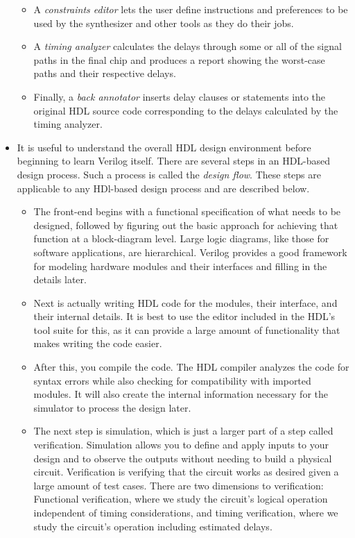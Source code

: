 \documentclass[10pt,a4paper]{article}
\begin{document}
\begin{itemize}
\begin{itemize}
\item A \textit{constraints editor} lets the user define instructions and preferences to be used by the synthesizer and other tools as they do their jobs. 
\item A \textit{timing analyzer} calculates the delays through some or all of the signal paths in the final chip and produces a report showing the worst-case paths and their respective delays.
\item Finally, a \textit{back annotator} inserts delay clauses or statements into the original HDL source code corresponding to the delays calculated by the timing analyzer. 
\end{itemize}
\item It is useful to understand the overall HDL design environment before beginning to learn Verilog itself. There are several steps in an HDL-based design process. Such a process is called the \textit{design flow}. These steps are applicable to any HDl-based design process and are described below.
\begin{itemize}
\item The front-end begins with a functional specification of what needs to be designed, followed by figuring out the basic approach for achieving that function at a block-diagram level. Large logic diagrams, like those for software applications, are hierarchical. Verilog provides a good framework for modeling hardware modules and their interfaces and filling in the details later.
\item Next is actually writing HDL code for the modules, their interface, and their internal details. It is best to use the editor included in the HDL's tool suite for this, as it can provide a large amount of functionality that makes writing the code easier.
\item After this, you compile the code. The HDL compiler analyzes the code for syntax errors while also checking for compatibility with imported modules. It will also create the internal information necessary for the simulator to process the design later.
\item The next step is simulation, which is just a larger part of a step called verification. Simulation allows you to define and apply inputs to your design and to observe the outputs without needing to build a physical circuit. Verification is verifying that the circuit works as desired given a large amount of test cases. There are two dimensions to verification: Functional verification, where we study the circuit's logical operation independent of timing considerations, and timing verification, where we study the circuit's operation including estimated delays.

\end{itemize}
\end{itemize}
\end{document}
